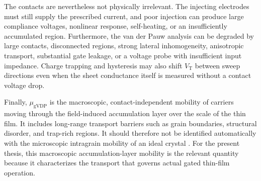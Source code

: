 The contacts are nevertheless not physically irrelevant. The injecting
electrodes must still supply the prescribed current, and poor injection can
produce large compliance voltages, nonlinear response, self-heating, or an
insufficiently accumulated region. Furthermore, the van der Pauw analysis can
be degraded by large contacts, disconnected regions, strong lateral
inhomogeneity, anisotropic transport, substantial gate leakage, or a voltage
probe with insufficient input impedance. Charge trapping and hysteresis may
also shift $V_\mathrm{T}$ between sweep directions even when the sheet
conductance itself is measured without a contact voltage drop.

Finally, $\mu_\mathrm{gVDP}$ is the macroscopic, contact-independent mobility of
carriers moving through the field-induced accumulation layer over the scale of
the thin film. It includes long-range transport barriers such as grain
boundaries, structural disorder, and trap-rich regions. It should therefore not
be identified automatically with the microscopic intragrain mobility of an
ideal crystal \cite{Rolin2017GVDP}. For the present thesis, this macroscopic
accumulation-layer mobility is the relevant quantity because it characterizes
the transport that governs actual gated thin-film operation.
